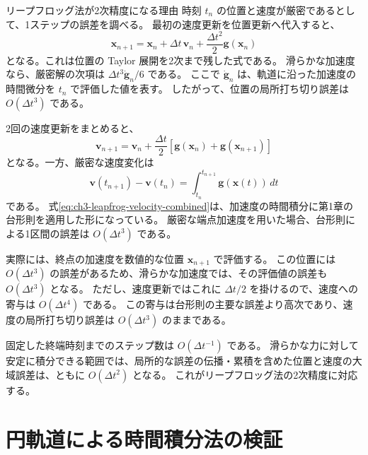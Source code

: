\begin{topicblock}{リープフロッグ法が2次精度になる理由}
時刻 $t_n$ の位置と速度が厳密であるとして、1ステップの誤差を調べる。
最初の速度更新を位置更新へ代入すると、
\begin{equation}
 \boldsymbol{x}_{n+1}=\boldsymbol{x}_n+\Delta t\,\boldsymbol{v}_n+\frac{\Delta t^2}{2}\boldsymbol{g}(\boldsymbol{x}_n)
\label{eq:ch3-leapfrog-position-combined}
\end{equation}
となる。これは位置の Taylor 展開を2次まで残した式である。
滑らかな加速度なら、厳密解の次項は $\Delta t^3\dot{\boldsymbol{g}}_n/6$ である。
ここで $\dot{\boldsymbol{g}}_n$ は、軌道に沿った加速度の時間微分を $t_n$ で評価した値を表す。
したがって、位置の局所打ち切り誤差は $O(\Delta t^3)$ である。

2回の速度更新をまとめると、
\begin{equation}
 \boldsymbol{v}_{n+1}=\boldsymbol{v}_n+\frac{\Delta t}{2}
 \left[\boldsymbol{g}(\boldsymbol{x}_n)+\boldsymbol{g}(\boldsymbol{x}_{n+1})\right]
\label{eq:ch3-leapfrog-velocity-combined}
\end{equation}
となる。一方、厳密な速度変化は
\begin{equation}
 \boldsymbol{v}(t_{n+1})-\boldsymbol{v}(t_n)=\int_{t_n}^{t_{n+1}}\boldsymbol{g}(\boldsymbol{x}(t))\,dt
\end{equation}
である。
式\eqref{eq:ch3-leapfrog-velocity-combined}は、加速度の時間積分に第1章の台形則を適用した形になっている。
厳密な端点加速度を用いた場合、台形則による1区間の誤差は $O(\Delta t^3)$ である。

実際には、終点の加速度を数値的な位置 $\boldsymbol{x}_{n+1}$ で評価する。
この位置には $O(\Delta t^3)$ の誤差があるため、滑らかな加速度では、その評価値の誤差も $O(\Delta t^3)$ となる。
ただし、速度更新ではこれに $\Delta t/2$ を掛けるので、速度への寄与は $O(\Delta t^4)$ である。
この寄与は台形則の主要な誤差より高次であり、速度の局所打ち切り誤差は $O(\Delta t^3)$ のままである。

固定した終端時刻までのステップ数は $O(\Delta t^{-1})$ である。
滑らかな力に対して安定に積分できる範囲では、局所的な誤差の伝播・累積を含めた位置と速度の大域誤差は、ともに $O(\Delta t^2)$ となる。
これがリープフロッグ法の2次精度に対応する。
\end{topicblock}
\section{円軌道による時間積分法の検証}
\label{sec:ch3-circular-test}

